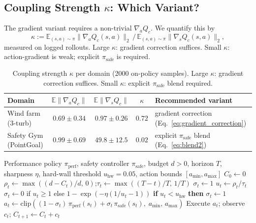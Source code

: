 \documentclass{article}
\begin{document}
\subsection{Coupling Strength \texorpdfstring{$\kappa$}{kappa}: Which Variant?}
\label{sec:scope}

The gradient variant requires a non-trivial $\nabla_a Q_c$.
We quantify this by
\begin{equation}
    \kappa := \mathbb{E}_{(s,a)\sim\pi}\|\nabla_a Q_c(s,a)\|_2 \,\big/\, \mathbb{E}_{(s,a)\sim\pi}\|\nabla_s Q_c(s,a)\|_2,
\label{eq:kappa}
\end{equation}
measured on logged rollouts.
Large $\kappa$: gradient correction suffices.
Small $\kappa$: action-gradient is weak; explicit $\pi_{\mathrm{safe}}$ is required.

\begin{table}[h]
\centering
\caption{Coupling strength $\kappa$ per domain (2000 on-policy samples). Large $\kappa$: gradient correction suffices. Small $\kappa$: explicit $\pi_{\mathrm{safe}}$ blend required.}
\label{tab:coupling}
\begin{tabular}{lcccl}
\toprule
Domain & $\mathbb{E}\|\nabla_a Q_c\|$ & $\mathbb{E}\|\nabla_s Q_c\|$ & $\kappa$ & Recommended variant \\
\midrule
Wind farm (3-turb)     & $0.69\!\pm\!0.34$ & $0.97\!\pm\!0.26$ & $\mathbf{0.72}$ & gradient correction (Eq.~\ref{eq:gradient_correction}) \\
Safety Gym (PointGoal) & $0.99\!\pm\!0.69$ & $49.8\!\pm\!12.5$ & $\mathbf{0.02}$ & explicit $\pi_{\mathrm{safe}}$ blend (Eq.~\ref{eq:blend2}) \\
\bottomrule
\end{tabular}
\end{table}

\begin{algorithm}[t]
\caption{Urgency-Ratio Controller Blending (with safeguards)}
\label{alg:budget}
\begin{algorithmic}[1]
\REQUIRE Performance policy $\pi_{\mathrm{perf}}$, safety controller $\pi_{\mathrm{safe}}$, budget $d>0$, horizon $T$, sharpness $\eta$, hard-wall threshold $u_{\mathrm{hw}}\!=\!0.05$, action bounds $[a_{\min}, a_{\max}]$
\STATE $C_0 \gets 0$
    \STATE $\rho_t \gets \max((d - C_t)/d,\, 0)$;\quad $\tau_t \gets \max((T-t)/T,\, 1/T)$
        \STATE $\sigma_t \gets 1$ 
    \ELSE
        \STATE $u_t \gets \rho_t / \tau_t$
        \STATE $\sigma_t \gets 0$ if $u_t \ge 1$ else $1 - \exp(-\eta(1/u_t - 1))$
        \STATE \textbf{if} $u_t < u_{\mathrm{hw}}$ \textbf{then} $\sigma_t \gets 1$ 
    \ENDIF
    \STATE $a_t \gets \mathrm{clip}((1-\sigma_t)\,\pi_{\mathrm{perf}}(s_t) + \sigma_t\,\pi_{\mathrm{safe}}(s_t),\; a_{\min},\, a_{\max})$
    \STATE Execute $a_t$; observe $c_t$; $C_{t+1} \gets C_t + c_t$
\ENDFOR
\end{algorithmic}
\end{algorithm}
\end{document}
